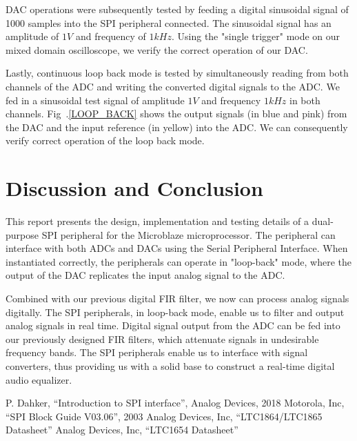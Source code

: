 \documentclass[conference]{IEEEtran}
\begin{document}
DAC operations were subsequently tested by feeding a digital sinusoidal signal of 1000 samples into the SPI peripheral connected. The sinusoidal signal has an amplitude of $1V$ and frequency of $1kHz$. Using the "single trigger" mode on our mixed domain oscilloscope, we verify the correct operation of our DAC.

Lastly, continuous loop back mode is tested by simultaneously reading from both channels of the ADC and writing the converted digital signals to the ADC. We fed in a sinusoidal test signal of amplitude $1V$ and frequency $1kHz$ in both channels. Fig~.\ref{LOOP_BACK} shows the output signals (in blue and pink) from the DAC and the input reference (in yellow) into the ADC. We can consequently verify correct operation of the loop back mode.


\section{Discussion and Conclusion} \label{discussion}
This report presents the design, implementation and testing details of a dual-purpose SPI peripheral for the Microblaze\textregistered{} microprocessor. The peripheral can interface with both ADCs and DACs using the Serial Peripheral Interface. When instantiated correctly, the peripherals can operate in "loop-back" mode, where the output of the DAC replicates the input analog signal to the ADC. 

Combined with our previous digital FIR filter, we now can process analog signals digitally. The SPI peripherals, in loop-back mode, enable us to filter and output analog signals in real time. Digital signal output from the ADC can be fed into our previously designed FIR filters, which attenuate signals in undesirable frequency bands. The SPI peripherals enable us to interface with signal converters, thus providing us with a solid base to construct a real-time digital audio equalizer.

\begin{thebibliography}{00}
 P. Dahker, ``Introduction to SPI interface'', Analog Devices, 2018
 Motorola, Inc, ``SPI Block Guide V03.06'', 2003
 Analog Devices, Inc, ``LTC1864/LTC1865 Datasheet''
 Analog Devices, Inc, ``LTC1654 Datasheet''
\end{thebibliography}

\newpage
\onecolumn
\end{document}
